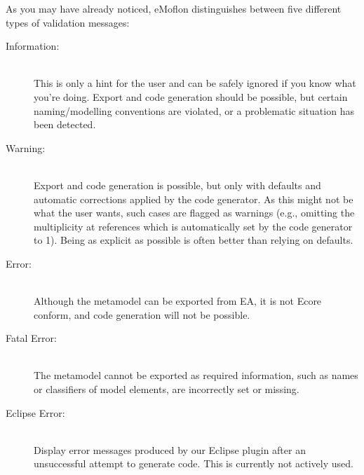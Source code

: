 \vspace*{1cm}

As you may have already noticed, eMoflon distinguishes between five different types of validation messages:
\begin{description}
  \item[Information:]~\\
  This is only a hint for the user and can be safely ignored if you know what you're doing.
  Export and code generation should be possible, but certain naming/modelling conventions are violated, or a problematic situation has been detected.
  
  \item[Warning:]~\\ Export and code generation is possible, but only with defaults and automatic corrections applied by the code generator.
  As this might not be what the user wants, such cases are flagged as warnings (e.g., omitting the multiplicity at references which is automatically set by the
  code generator to 1).
  Being as explicit as possible is often better than relying on defaults.
  
  \item[Error:]~\\ Although the metamodel can be exported from EA, it is not Ecore conform, and code generation will not be possible.
 
  \item[Fatal Error:]~\\ The metamodel cannot be exported as required information, such as names or classifiers of model elements, are incorrectly set or
  missing.
  
  \item[Eclipse Error:]~\\ Display error messages produced by our Eclipse plugin after an unsuccessful attempt to generate code. This is currently not actively
  used.

\end{description}

